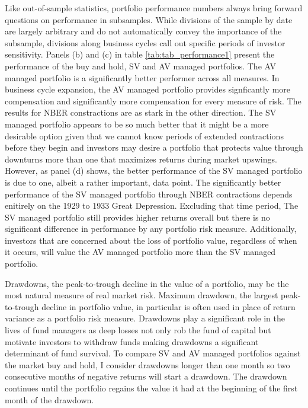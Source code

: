 Like out-of-sample statistics, portfolio performance numbers always bring forward questions on performance in subsamples. While divisions of the sample by date are largely arbitrary and do not automatically convey the importance of the subsample, divisions along business cycles call out specific periods of investor sensitivity. Panels (b) and (c) in table \ref{tab:tab_performance1} present the performance of the buy and hold, SV and AV managed portfolios. The AV managed portfolio is a significantly better performer across all measures. In business cycle expansion, the AV managed portfolio provides signficantly more compensation and significantly more compensation for every measure of risk. The results for NBER constractions are as stark in the other direction. The SV managed portfolio appears to be so much better that it might be a more desirable option given that we cannot know periods of extended contractions before they begin and investors may desire a portfolio that protects value through downturns more than one that maximizes returns during market upswings. However, as panel (d) shows, the better performance of the SV managed portfolio is due to one, albeit a rather important, data point. The significantly better performance of the SV managed portfolio through NBER contractions depends enitirely on the 1929 to 1933 Great Depression. Excluding that time period, The SV managed portfolio still provides higher returns overall but there is no significant difference in performance by any portfolio risk measure. Additionally, investors that are concerned about the loss of portfolio value, regardless of when it occurs, will value the AV managed portfolio more than the SV managed portfolio.

Drawdowns, the peak-to-trough decline in the value of a portfolio, may be the most natural measure of real market risk. \citep{magdon-ismail_maximum_2006} Maximum drawdown, the largest peak-to-trough decline in portfolio value, in particular is often used in place of return variance as a portfolio risk measure. \citep{johansen_large_2000,articlev1,articlev2,noauthor_sornette_nodate} Drawdowns play a significant role in the lives of fund managers as deep losses not only rob the fund of capital but motivate investors to withdraw funds making drawdowns a significant determinant of fund survival. \citep{baba_hedge_nodate,papaioannou_procyclical_2013,lang_2006} To compare SV and AV managed portfolios against the market buy and hold, I consider drawdowns longer than one month so two consecutive months of negative returns will start a drawdown. The drawdown continues until the portfolio regains the value it had at the beginning of the first month of the drawdown. 

